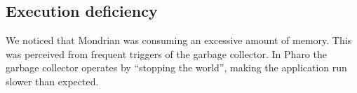 \documentclass{sig-alternate}
\newcommand{\figref}[1]{Figure~\ref{fig:#1}}
\begin{document}
%
%

\subsection{Execution deficiency}

We noticed that Mondrian was consuming an excessive amount of memory. This was perceived from frequent triggers of the garbage collector. In Pharo the garbage collector operates by ``stopping the world'', making the application run slower than expected.
\end{document}
